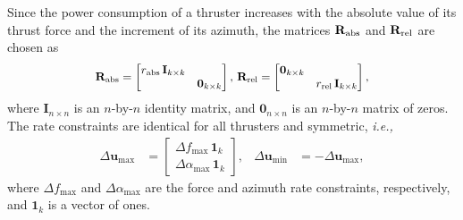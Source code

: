 \noindent Since the power consumption of a thruster increases with the absolute value of its thrust force and the increment of its azimuth, the matrices $\mathbf{R}_{\rm abs}$ and $\mathbf{R}_{\rm rel}$ are chosen as
\begin{equation}
    \scale[0.931]{\mathbf{R}_{\rm abs} = \begin{bmatrix} r_{\rm abs}\,\mathbf{I}_{k \times k} & \\ & \mathbf{0}_{k \times k} \end{bmatrix}, \,
    \mathbf{R}_{\rm rel} = \begin{bmatrix} \mathbf{0}_{k \times k} & \\ & r_{\rm rel}\,\mathbf{I}_{k \times k} \end{bmatrix},}
\end{equation}
where $\mathbf{I}_{n \times n}$ is an $n$-by-$n$ identity matrix, and $\mathbf{0}_{n \times n}$ is an $n$-by-$n$ matrix of zeros.
The rate constraints are identical for all thrusters and symmetric, \emph{i.e.,}
\begin{align}
    \Delta\mathbf{u}_{\max} &= \begin{bmatrix} \Delta f_{\max}\,\mathbf{1}_k \\ \Delta \alpha_{\max}\,\mathbf{1}_k \end{bmatrix}, &
    \Delta\mathbf{u}_{\min} &= - \Delta\mathbf{u}_{\max},
\end{align}
where $\Delta f_{\max}$ and $\Delta \alpha_{\max}$ are the force and azimuth rate constraints, respectively, and $\mathbf{1}_k$ is a vector of ones.


